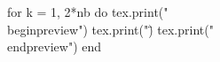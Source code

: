 \documentclass[border=2 mm]{article}
\begin{document}
\begin{luacode*}
for k = 1, 2*nb do
    tex.print("\\begin{preview}")
    tex.print("\")
    tex.print("\\end{preview}")
end
\end{luacode*}
\end{document}
